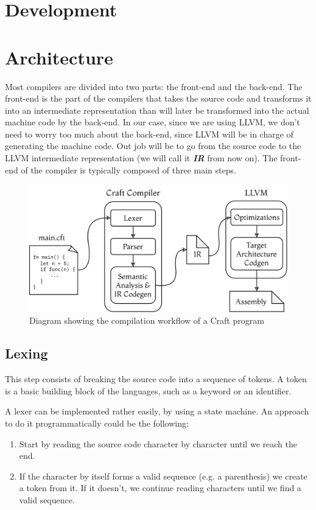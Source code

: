 ﻿\documentclass[10pt,a4paper,twocolumn,twoside]{article}
\begin{document}
\section{Development}
\section{Architecture}
Most compilers are divided into two parts: the front-end and the back-end. The
front-end is the part of the compilers that takes the source code and transforms
it into an intermediate representation than will later be transformed into the
actual machine code by the back-end. In our case, since we are using LLVM, we
don't need to worry too much about the back-end, since LLVM will be in charge of
generating the machine code. Out job will be to go from the source code to the
LLVM intermediate representation (we will call it \textbf{\textit{IR}} from now
on). The front-end of the compiler is typically composed of three main steps.

\begin{figure}[ht]
\centering
\captionsetup{justification=centering,margin=1cm}
\includegraphics[width=\linewidth]{arch}
\caption{Diagram showing the compilation workflow of a Craft program}
\end{figure}

\subsection{Lexing} 
This step consists of breaking the source code into a sequence of tokens. A
token is a basic building block of the languages, such as a keyword or an
identifier.

A lexer can be implemented rather easily, by using a state machine. An approach
to do it programmatically could be the following:

\begin{enumerate}
    \item Start by reading the source code character by character until we reach
        the end.
    \item If the character by itself forms a valid sequence (e.g. a parenthesis)
        we create a token from it. If it doesn't, we continue reading characters
        until we find a valid sequence. 
\end{enumerate}
\end{document}
